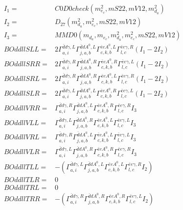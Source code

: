 \documentclass[A4,landscape]{article}
\begin{document}
\begin{align} 
I_1 = & C0D0check(m^2_{e_{{c}}}, mS22, mV12, m^2_{d_{{a}}}) \\ 
I_2 = & D_{27}(m^2_{d_{{a}}}, m^2_{e_{{c}}}, mS22, mV12) \\ 
I_3 = & MMD0(m_{d_{{a}}}, m_{e_{{c}}}, m^2_{d_{{a}}}, m^2_{e_{{c}}}, mS22, mV12) \\ 
  BOddllSLL= & 2  \Gamma^{\bar{d}d \gamma ,L}_{a, i} \Gamma^{\bar{d}d A^0 ,L}_{j, a, b} \Gamma^{\bar{e}e A^0 ,L}_{c, k, b} \Gamma^{\bar{e}e \gamma ,R}_{l, c} (I_1 - 2 I_2) \\ 
  BOddllSRR= & 2  \Gamma^{\bar{d}d \gamma ,R}_{a, i} \Gamma^{\bar{d}d A^0 ,R}_{j, a, b} \Gamma^{\bar{e}e A^0 ,R}_{c, k, b} \Gamma^{\bar{e}e \gamma ,L}_{l, c} (I_1 - 2 I_2) \\ 
  BOddllSRL= & 2  \Gamma^{\bar{d}d \gamma ,R}_{a, i} \Gamma^{\bar{d}d A^0 ,R}_{j, a, b} \Gamma^{\bar{e}e A^0 ,L}_{c, k, b} \Gamma^{\bar{e}e \gamma ,R}_{l, c} (I_1 - 2 I_2) \\ 
  BOddllSLR= & 2  \Gamma^{\bar{d}d \gamma ,L}_{a, i} \Gamma^{\bar{d}d A^0 ,L}_{j, a, b} \Gamma^{\bar{e}e A^0 ,R}_{c, k, b} \Gamma^{\bar{e}e \gamma ,L}_{l, c} (I_1 - 2 I_2) \\ 
  BOddllVRR= &  \Gamma^{\bar{d}d \gamma ,R}_{a, i} \Gamma^{\bar{d}d A^0 ,L}_{j, a, b} \Gamma^{\bar{e}e A^0 ,R}_{c, k, b} \Gamma^{\bar{e}e \gamma ,R}_{l, c} I_3 \\ 
  BOddllVLL= &  \Gamma^{\bar{d}d \gamma ,L}_{a, i} \Gamma^{\bar{d}d A^0 ,R}_{j, a, b} \Gamma^{\bar{e}e A^0 ,L}_{c, k, b} \Gamma^{\bar{e}e \gamma ,L}_{l, c} I_3 \\ 
  BOddllVRL= &  \Gamma^{\bar{d}d \gamma ,R}_{a, i} \Gamma^{\bar{d}d A^0 ,L}_{j, a, b} \Gamma^{\bar{e}e A^0 ,L}_{c, k, b} \Gamma^{\bar{e}e \gamma ,L}_{l, c} I_3 \\ 
  BOddllVLR= &  \Gamma^{\bar{d}d \gamma ,L}_{a, i} \Gamma^{\bar{d}d A^0 ,R}_{j, a, b} \Gamma^{\bar{e}e A^0 ,R}_{c, k, b} \Gamma^{\bar{e}e \gamma ,R}_{l, c} I_3 \\ 
  BOddllTLL= & -( \Gamma^{\bar{d}d \gamma ,L}_{a, i} \Gamma^{\bar{d}d A^0 ,L}_{j, a, b} \Gamma^{\bar{e}e A^0 ,L}_{c, k, b} \Gamma^{\bar{e}e \gamma ,R}_{l, c} I_2) \\ 
  BOddllTLR= & 0 \\ 
  BOddllTRL= & 0 \\ 
  BOddllTRR= & -( \Gamma^{\bar{d}d \gamma ,R}_{a, i} \Gamma^{\bar{d}d A^0 ,R}_{j, a, b} \Gamma^{\bar{e}e A^0 ,R}_{c, k, b} \Gamma^{\bar{e}e \gamma ,L}_{l, c} I_2) \\ 
\end{align} 
\end{document}
